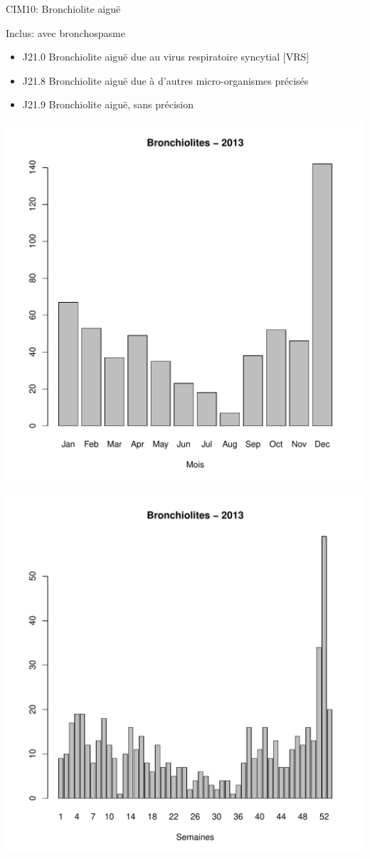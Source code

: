 \documentclass[12pt,english,french,twoside]{book}\usepackage[]{graphicx}\usepackage[]{color}
\makeatletter
\def\maxwidth{ %
  \ifdim\Gin@nat@width>\linewidth
    \linewidth
  \else
    \Gin@nat@width
  \fi
}
\newenvironment{knitrout}{}{} %
\makeatother
\begin{document}
CIM10: Bronchiolite aiguë

Inclus:
    avec bronchospasme
\begin{itemize}
  \item J21.0 Bronchiolite aiguë due au virus respiratoire syncytial [VRS]
  \item J21.8 Bronchiolite aiguë due à d'autres micro-organismes précisés
  \item J21.9 Bronchiolite aiguë, sans précision
\end{itemize}

\begin{knitrout}
\color{fgcolor}
\includegraphics[width=\maxwidth]{figure/bron1} 

\includegraphics[width=\maxwidth]{figure/bron2} 

\end{knitrout}
\end{document}
